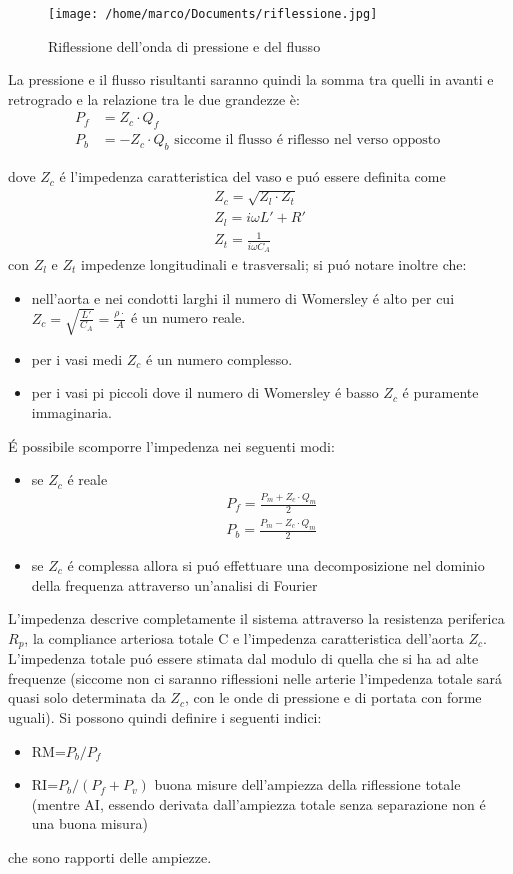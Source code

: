 \documentclass[10pt]{article}
\begin{document}
 \begin{figure}[h!]
\centering
\texttt{[image: /home/marco/Documents/riflessione.jpg]}
\caption{Riflessione dell'onda di pressione e del flusso}
\label{fig:riflessione}
\end{figure}

La pressione e il flusso risultanti saranno quindi la somma tra quelli in avanti e retrogrado e la relazione tra le due grandezze è:
\begin{align*}
    P_f & =Z_c \cdot Q_f \\
    P_b & =-Z_c \cdot Q_b  \text{ siccome il flusso é riflesso nel verso opposto }
\end{align*}

dove $Z_c$ é l'impedenza caratteristica del vaso e puó essere definita come
\begin{align*}
    Z_c=\sqrt{Z_l \cdot Z_t}\\
    Z_l= i \omega L'+R' \\
    Z_t=\frac{1}{i \omega C_A}
\end{align*}
con $Z_l$ e $Z_t$ impedenze longitudinali e trasversali; si puó notare inoltre che:
\begin{itemize}
    \item nell'aorta e nei condotti larghi il numero di Womersley é alto per cui $Z_c= \sqrt{\frac{L'}{C_A}}=\frac{\rho \cdot}{A}$ é un numero reale.
    \item per i vasi medi $Z_c$ é un numero complesso.
    \item per i vasi pi piccoli dove il numero di Womersley é basso $Z_c$ é puramente immaginaria.
\end{itemize}

É possibile scomporre l'impedenza nei seguenti modi:
\begin{itemize}
\item se $Z_c$ é reale \textrightarrow 
\begin{align*}
P_f=\frac{P_m+Z_c \cdot Q_m}{2} \\
P_b=\frac{P_m-Z_c \cdot Q_m}{2}
\end{align*}
\item se $Z_c$ é complessa allora si puó effettuare una decomposizione nel dominio della frequenza attraverso un'analisi di Fourier
\end{itemize}

L'impedenza descrive completamente il sistema attraverso la resistenza periferica $R_p$, la compliance arteriosa totale C e l'impedenza caratteristica dell'aorta $Z_c$. L'impedenza totale puó essere stimata dal modulo di quella che si ha ad alte frequenze (siccome non ci saranno riflessioni nelle arterie l'impedenza totale sará quasi solo determinata da $Z_c$, con le onde di pressione e di portata con forme uguali).
Si possono quindi definire i seguenti indici:
\begin{itemize}
\item RM=$P_b/P_f$
\item RI=$P_b/(P_f+P_v)$ \textrightarrow buona misure dell'ampiezza della riflessione totale (mentre AI, essendo derivata dall'ampiezza totale senza separazione non é una buona misura)
\end{itemize}  
che sono rapporti delle ampiezze.
\end{document}
